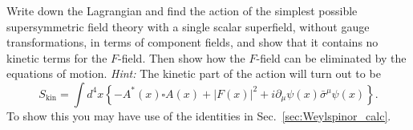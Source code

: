 \documentclass[notes.tex]{subfiles}
\begin{document}
\begin{Exercise}[]
\label{ex:simpleL}
Write down the Lagrangian and find the action of the simplest possible supersymmetric field theory with a single scalar superfield, without gauge transformations, in terms of component fields, and show that it contains no kinetic terms for the $F$-field. Then show how the $F$-field can be eliminated by the equations of motion. {\it Hint:} The kinetic part of the action will turn out to be
\begin{equation}
S_\text{kin}=\int d^4x \left\{-A^*(x)\square A(x)+|F(x)|^2+i\partial_\mu\psi(x)\bar\sigma^\mu\psi(x)\right\}.
\end{equation}
To show this you may have use of the identities in Sec.~\ref{sec:Weylspinor_calc}.
\end{Exercise}
\end{document}
